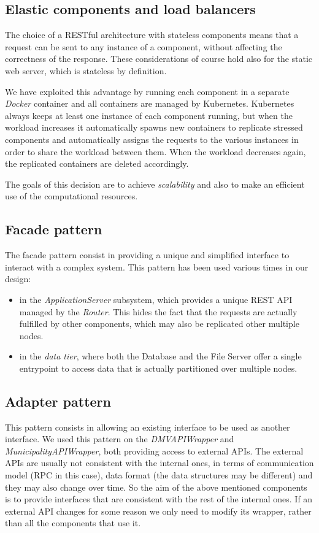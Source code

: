\subsection{Elastic components and load balancers}
The choice of a RESTful architecture with stateless components means that a
request can be sent to any instance of a component, without affecting the
correctness of the response. These considerations of course hold also for
the static web server, which is stateless by definition.

We have exploited this advantage by running each component in a separate
\emph{Docker} container and all containers are managed by Kubernetes.
Kubernetes always keeps at least one instance of each component running, but
when the workload increases it automatically spawns new containers to replicate
stressed components and automatically assigns the requests to the various
instances in order to share the workload between them.
When the workload decreases again, the replicated containers are deleted
accordingly.

The goals of this decision are to achieve \emph{scalability} and also to make
an efficient use of the computational resources.

\subsection{Facade pattern}
The facade pattern consist in providing a unique and simplified interface to
interact with a complex system. This pattern has been used various times
in our design:
\begin{itemize}
    \item in the \emph{ApplicationServer} subsystem, which provides a unique
    REST API managed by the \emph{Router}. This hides the fact that the requests
    are actually fulfilled by other components, which may also be replicated
    other multiple nodes.
    \item in the \emph{data tier}, where both the Database and the File Server
    offer a single entrypoint to access data that is actually partitioned over
    multiple nodes.
\end{itemize}

\subsection{Adapter pattern}
\label{subsec:adapter_pattern}
This pattern consists in allowing an existing interface to be used as another
interface. We used this pattern on the \emph{DMVAPIWrapper} and
\emph{MunicipalityAPIWrapper}, both providing access to external APIs.
The external APIs are usually not consistent with the internal ones, in
terms of communication model (RPC in this case), data format (the data
structures may be different) and they may also change over time.
So the aim of the above mentioned components is to provide interfaces that are
consistent with the rest of the internal ones. If an external API changes for
some reason we only need to modify its wrapper, rather than all the components
that use it.

